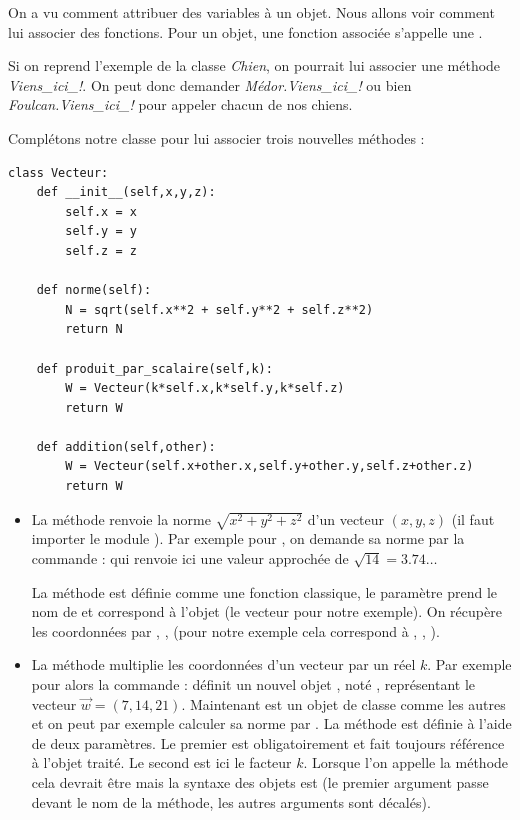 \documentclass[11pt,class=report,crop=false]{standalone}
\begin{document}
\begin{cours}



On a vu comment attribuer des variables à un objet. Nous allons voir comment lui associer des fonctions.
Pour un objet, une fonction associée s'appelle une .

Si on reprend l'exemple de la classe \emph{Chien}, on pourrait lui associer une méthode \emph{Viens\_ici\_!}.
On peut donc demander \emph{Médor.Viens\_ici\_!} ou bien \emph{Foulcan.Viens\_ici\_!} pour appeler chacun de nos chiens.

\medskip

Complétons notre classe  pour lui associer trois nouvelles méthodes :
\begin{lstlisting}
class Vecteur:
    def __init__(self,x,y,z):
        self.x = x
        self.y = y
        self.z = z

    def norme(self):
        N = sqrt(self.x**2 + self.y**2 + self.z**2)
        return N

    def produit_par_scalaire(self,k):
        W = Vecteur(k*self.x,k*self.y,k*self.z)
        return W

    def addition(self,other):
        W = Vecteur(self.x+other.x,self.y+other.y,self.z+other.z)
        return W
\end{lstlisting} 

\begin{itemize}
  \item La méthode  renvoie la norme $\sqrt{x^2+y^2+z^2}$ d'un vecteur $(x,y,z)$ (il faut importer le module ). 
  Par exemple pour , on demande sa norme par la commande :
qui renvoie ici une valeur approchée de $\sqrt{14} = 3.74\ldots$  

   La méthode  est définie comme une fonction classique, le paramètre prend le nom de 
   et correspond à l'objet (le vecteur  pour notre exemple). On récupère les coordonnées par
   , ,  (pour notre exemple cela correspond à , , ).
  
  
  \item La méthode  multiplie les coordonnées d'un vecteur par un réel $k$.
  Par exemple pour  alors la commande :
définit un nouvel objet , noté , représentant le vecteur $\vec w = (7,14,21)$.
Maintenant  est un objet de classe  comme les autres et on peut par exemple calculer sa norme par . 
La méthode  est définie à l'aide de deux paramètres. Le premier est obligatoirement  et fait toujours référence à l'objet traité. Le second est ici le facteur $k$. Lorsque l'on appelle la méthode cela devrait être  mais la syntaxe des objets est 
(le premier argument passe devant le nom de la méthode, les autres arguments sont décalés).



\end{itemize}
\end{cours}
\end{document}
